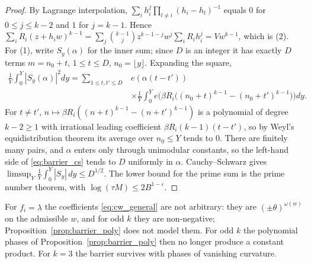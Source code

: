 \begin{proof}
By Lagrange interpolation, $\sum_ih_i^j\prod_{l\ne i}(h_i-h_l)^{-1}$ equals $0$ for $0\le j\le k-2$ and $1$ for $j=k-1$. Hence $\sum_iR_i(z+h_iw)^{k-1}=\sum_j\binom{k-1}{j}z^{k-1-j}w^j\sum_iR_ih_i^j=Vw^{k-1}$, which is (2). For (1), write $S_y(\alpha)$ for the inner sum; since $D$ is an integer it has exactly $D$ terms $m=n_0+t$, $1\le t\le D$, $n_0=\lfloor y\rfloor$. Expanding the square,
\begin{equation}
\begin{aligned}
\frac1Y\int_0^Y|S_y(\alpha)|^2dy=\sum_{1\le t,t'\le D}&e(\alpha(t-t'))\\
&\times\frac1Y\int_0^Ye\bigl(\beta R_i\bigl((n_0+t)^{k-1}-(n_0+t')^{k-1}\bigr)\bigr)dy .
\end{aligned}
\label{eq:barrier_cs}
\end{equation}
For $t\ne t'$, $n\mapsto\beta R_i((n+t)^{k-1}-(n+t')^{k-1})$ is a polynomial of degree $k-2\ge1$ with irrational leading coefficient $\beta R_i(k-1)(t-t')$, so by Weyl's equidistribution theorem its average over $n_0\le Y$ tends to $0$. There are finitely many pairs, and $\alpha$ enters only through unimodular constants, so the left-hand side of \eqref{eq:barrier_cs} tends to $D$ uniformly in $\alpha$. Cauchy--Schwarz gives $\limsup_Y\frac1Y\int_0^Y|S_y|\,dy\le D^{1/2}$. The lower bound for the prime sum is the prime number theorem, with $\log(\tau M)\le2B^{1-\varepsilon}$.
\end{proof}

For $f_i=\lambda$ the coefficients \eqref{eq:cw_general} are not arbitrary: they are $(\pm\theta)^{\omega(w)}$ on the admissible $w$, and for odd $k$ they are non-negative; Proposition~\ref{prop:barrier_poly} does not model them. For odd $k$ the polynomial phases of Proposition~\ref{prop:barrier_poly} then no longer produce a constant product. For $k=3$ the barrier survives with phases of vanishing curvature.


